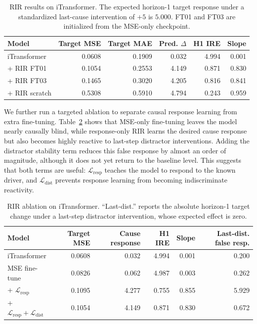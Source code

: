 \documentclass{article}
\begin{document}
\begin{table}[t]
\centering
\caption{RIR results on iTransformer. The expected horizon-1 target
response under a standardized last-cause intervention of $+5$ is $5.000$. FT01 and
FT03 are initialized from the MSE-only checkpoint.}
\label{tab:rir}
\begin{tabular}{lrrrrr}
\toprule
Model & Target MSE & Target MAE & Pred. $\Delta$ & H1 IRE & Slope \\
\midrule
iTransformer & 0.0608 & 0.1909 & 0.032 & 4.994 & 0.001 \\
+ RIR FT01 & 0.1054 & 0.2553 & 4.149 & 0.871 & 0.830 \\
+ RIR FT03 & 0.1465 & 0.3020 & 4.205 & 0.816 & 0.841 \\
+ RIR scratch & 0.5308 & 0.5910 & 4.794 & 0.243 & 0.959 \\
\bottomrule
\end{tabular}
\end{table}

We further run a targeted ablation to separate causal response learning from extra
fine-tuning. Table~\ref{tab:rir_ablation} shows that MSE-only fine-tuning leaves the
model nearly causally blind, while response-only RIR learns the desired cause response
but also becomes highly reactive to last-step distractor interventions. Adding the
distractor stability term reduces this false response by almost an order of magnitude,
although it does not yet return to the baseline level. This suggests that both terms
are useful: $\mathcal{L}_{\mathrm{resp}}$ teaches the model to respond to the known
driver, and $\mathcal{L}_{\mathrm{dist}}$ prevents response learning from becoming
indiscriminate reactivity.

\begin{table}[t]
\centering
\caption{RIR ablation on iTransformer. ``Last-dist.'' reports the absolute
horizon-1 target change under a last-step distractor intervention, whose expected
effect is zero.}
\label{tab:rir_ablation}
\begin{tabular}{lrrrrr}
\toprule
Model & Target MSE & Cause response & H1 IRE & Slope & Last-dist. false resp. \\
\midrule
iTransformer & 0.0608 & 0.032 & 4.994 & 0.001 & 0.200 \\
MSE fine-tune & 0.0826 & 0.062 & 4.987 & 0.003 & 0.262 \\
+ $\mathcal{L}_{\mathrm{resp}}$ & 0.1095 & 4.277 & 0.755 & 0.855 & 5.929 \\
+ $\mathcal{L}_{\mathrm{resp}}+\mathcal{L}_{\mathrm{dist}}$ & 0.1054 & 4.149 & 0.871 & 0.830 & 0.672 \\
\bottomrule
\end{tabular}
\end{table}
\end{document}
